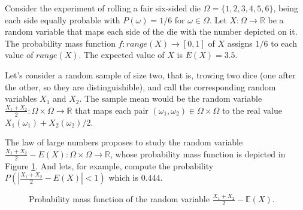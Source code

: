 \begin{example}
Consider the experiment of rolling a fair six-sided die $\Omega = \{1, 2, 3, 4, 5, 6\}$, being each side equally probable with $P(\omega)=1/6$ for $\omega \in \Omega$. Let $X:\Omega \rightarrow \mathbb{R}$ be a random variable that maps each side of the die with the number depicted on it. The probability mass function $f: range(X) \rightarrow [0, 1]$ of $X$ assigns $1/6$ to each value of $range(X)$. The expected value of $X$ is $E(X) = 3.5$.

Let's consider a random sample of size two, that is, trowing two dice (one after the other, so they are distinguishible), and call the corresponding random variables $X_1$ and $X_2$. The sample mean would be the random variable $\frac{X_1 + X_2}{2}: \Omega \times \Omega \rightarrow \mathbb{R}$ that maps each pair $(\omega_1, \omega_2) \in \Omega \times \Omega$ to the real value $X_1(\omega_1) + X_2(\omega_2) / 2$. 

The law of large numbers proposes to study the random variable $\frac{X_1 + X_2}{2} - E(X): \Omega \times \Omega \rightarrow \mathbb{R}$, whose probability mass function is depicted in Figure \ref{fig:law_large_numbers_1}. And lets, for example, compute the probability $P(  |\frac{X_1 + X_2}{2} - E(X)| < 1 )$ which is $0.444$.

\begin{figure}[t]
\centering
{}
\caption{\label{fig:law_large_numbers_1}Probability mass function of the random variable $\frac{X_1 + X_2 }{2} - \mathbb{E}(X)$.}
\end{figure}


\end{example}
